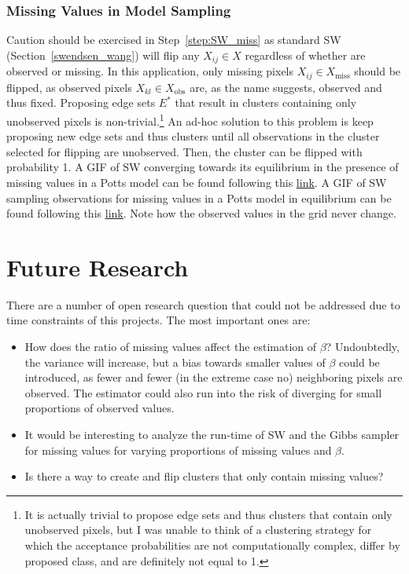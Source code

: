\documentclass[12pt, twoside]{article}
\newcommand{\1}{\mathbb{1}}
\begin{document}
\subsubsection{Missing Values in Model Sampling}\label{missing_values_model_sampling}
Caution should be exercised in Step~\ref{step:SW_miss} as standard SW (Section~\ref{swendsen_wang}) will flip any $X_{ij} \in X$ regardless of whether are observed or missing. In this application, only missing pixels $X_{ij} \in X_\text{miss}$ should be flipped, as observed pixels $X_{kl} \in X_\text{obs}$ are, as the name suggests, observed and thus fixed. 
Proposing edge sets $E^*$ that result in clusters containing only unobserved pixels is non-trivial.\footnote{It is actually trivial to propose edge sets and thus clusters that contain only unobserved pixels, but I was unable to think of a clustering strategy for which the acceptance probabilities are not computationally complex, differ by proposed class, and are definitely not equal to 1.} 
An ad-hoc solution to this problem is keep proposing new edge sets and thus clusters until all observations in the cluster selected for flipping are unobserved. Then, the cluster can be flipped with probability 1.
%
A GIF of SW converging towards its equilibrium in the presence of missing values in a Potts model can be found following this \href{https://github.com/maierhofert/2DPottsModel/blob/master/plots/grid_missing_burnin.gif}{\underline{link}}.
%
A GIF of SW sampling observations for missing values in a Potts model in equilibrium can be found following this \href{https://github.com/maierhofert/2DPottsModel/blob/master/plots/grid_missing_equilibrium.gif}{\underline{link}}.
Note how the observed values in the grid never change.

\clearpage
\section{Future Research}\label{future_research}
There are a number of open research question that could not be addressed due to time constraints of this projects. 
The most important ones are:
\begin{itemize}
    \item How does the ratio of missing values affect the estimation of $\beta$? Undoubtedly, the variance will increase, but a bias towards smaller values of $\beta$ could be introduced, as fewer and fewer (in the extreme case no) neighboring pixels are observed. The estimator could also run into the risk of diverging for small proportions of observed values.
    \item It would be interesting to analyze the run-time of SW and the Gibbs sampler for missing values for varying proportions of missing values and $\beta$.
    \item Is there a way to create and flip clusters that only contain missing values?
\end{itemize}
\end{document}
